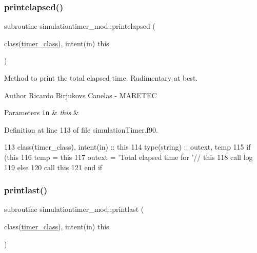 \subsubsection{\texorpdfstring{printelapsed()}{printelapsed()}}
{\footnotesize\ttfamily subroutine simulationtimer\+\_\+mod\+::printelapsed (\begin{DoxyParamCaption}\item[{class(\mbox{\hyperlink{structsimulationtimer__mod_1_1timer__class}{timer\+\_\+class}}), intent(in)}]{this }\end{DoxyParamCaption})\hspace{0.3cm}{\ttfamily [private]}}



Method to print the total elapsed time. Rudimentary at best. 

\begin{DoxyAuthor}{Author}
Ricardo Birjukovs Canelas -\/ M\+A\+R\+E\+T\+EC 
\end{DoxyAuthor}

\begin{DoxyParams}[1]{Parameters}
\mbox{\tt in}  & {\em this} & \\
\hline
\end{DoxyParams}


Definition at line 113 of file simulation\+Timer.\+f90.


\begin{DoxyCode}
113     \textcolor{keywordtype}{class}(timer\_class), \textcolor{keywordtype}{intent(in)} :: this
114     \textcolor{keywordtype}{type}(string) :: outext, temp
115     \textcolor{keywordflow}{if} (this%
116         temp = this%
117         outext = \textcolor{stringliteral}{'Total elapsed time for '}// this%
118         \textcolor{keyword}{call }log%
119     \textcolor{keywordflow}{else}
120         \textcolor{keyword}{call }this%
121 \textcolor{keywordflow}{    end if}    
\end{DoxyCode}
\mbox{\label{namespacesimulationtimer__mod_ae6e0d8f98a24587daf93cedb4e93ad79}} 
\subsubsection{\texorpdfstring{printlast()}{printlast()}}
{\footnotesize\ttfamily subroutine simulationtimer\+\_\+mod\+::printlast (\begin{DoxyParamCaption}\item[{class(\mbox{\hyperlink{structsimulationtimer__mod_1_1timer__class}{timer\+\_\+class}}), intent(in)}]{this }\end{DoxyParamCaption})\hspace{0.3cm}{\ttfamily [private]}}



